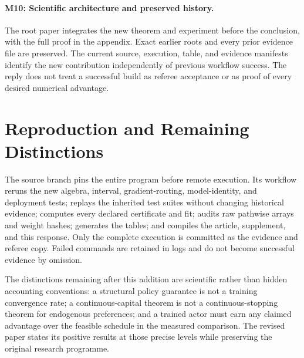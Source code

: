 \paragraph{M10: Scientific architecture and preserved history.}
The root paper integrates the new theorem and experiment before the conclusion, with the full proof in the appendix. Exact earlier roots and every prior evidence file are preserved. The current source, execution, table, and evidence manifests identify the new contribution independently of previous workflow success. The reply does not treat a successful build as referee acceptance or as proof of every desired numerical advantage.

\section{Reproduction and Remaining Distinctions}
The source branch pins the entire program before remote execution. Its workflow reruns the new algebra, interval, gradient-routing, model-identity, and deployment tests; replays the inherited test suites without changing historical evidence; computes every declared certificate and fit; audits raw pathwise arrays and weight hashes; generates the tables; and compiles the article, supplement, and this response. Only the complete execution is committed as the evidence and referee copy. Failed commands are retained in logs and do not become successful evidence by omission.

The distinctions remaining after this addition are scientific rather than hidden accounting conventions: a structural policy guarantee is not a training convergence rate; a continuous-capital theorem is not a continuous-stopping theorem for endogenous preferences; and a trained actor must earn any claimed advantage over the feasible schedule in the measured comparison. The revised paper states its positive results at those precise levels while preserving the original research programme.
